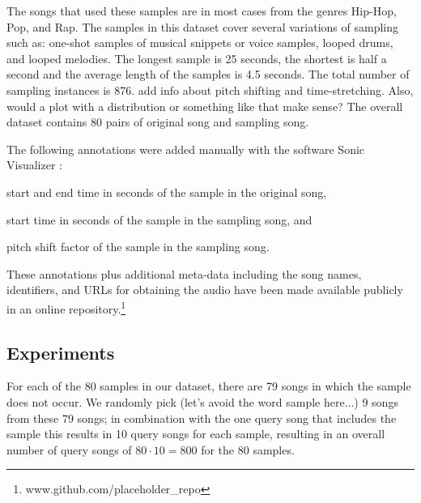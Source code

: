 \documentclass{article}
\begin{document}
    The songs that used these samples are in most cases from the genres Hip-Hop, Pop, and Rap. The samples in this dataset cover several variations of sampling such as: one-shot samples of musical snippets or voice samples, looped drums, and looped melodies. The longest sample is 25 seconds, the shortest is half a second and the average length of the samples is 4.5 seconds. The total number of sampling instances is 876. {\color{red}add info about pitch shifting and time-stretching. Also, would a plot with a distribution or something like that make sense?}
The overall dataset contains 80 pairs of original song and sampling song.

The following annotations were added manually with the software Sonic Visualizer \cite{SonicVisualiser}:
\begin{inparaenum}[(i)]
    \item   start and end time in seconds of the sample in the original song,
    \item   start time in seconds of the sample in the sampling song, and
    \item   pitch shift factor of the sample in the sampling song.
\end{inparaenum}

These annotations plus additional meta-data including the song names, identifiers, and URLs for obtaining the audio have been made available publicly in an online repository.\footnote{www.github.com/placeholder\_repo}

\subsection{Experiments}
\label{exp}
For each of the 80 samples in our dataset, there are 79 songs in which the sample does not occur. We randomly pick {\color{red}(let's avoid the word sample here...)} 9 songs from these 79 songs; in combination with the one query song that includes the sample this results in 10 query songs for each sample, resulting in an overall number of query songs of $80\cdot10 = 800$ for the $80$ samples.
\end{document}
